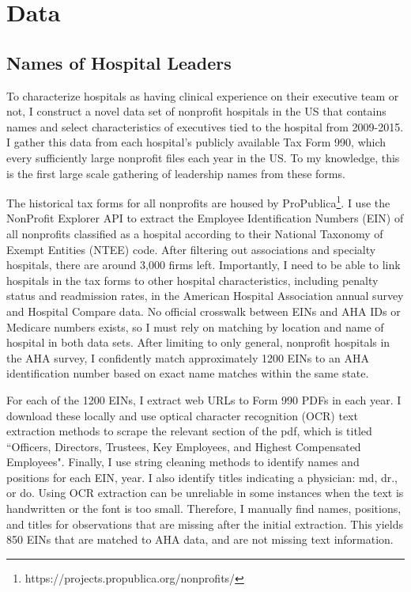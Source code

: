 \documentclass[12pt]{article}
\begin{document}
  
	
	\section{Data}\label{sec:data}

    \subsection{Names of Hospital Leaders}

    To characterize hospitals as having clinical experience on their executive team or not, I construct a novel data set of nonprofit hospitals in the US that contains names and select characteristics of executives tied to the hospital from 2009-2015. I gather this data from each hospital's publicly available Tax Form 990, which every sufficiently large nonprofit files each year in the US. To my knowledge, this is the first large scale gathering of leadership names from these forms. 

    The historical tax forms for all nonprofits are housed by ProPublica\footnote{https://projects.propublica.org/nonprofits/}. I use the NonProfit Explorer API to extract the Employee Identification Numbers (EIN) of all nonprofits classified as a hospital according to their National Taxonomy of Exempt Entities (NTEE) code. After filtering out associations and specialty hospitals, there are around 3,000 firms left. Importantly, I need to be able to link hospitals in the tax forms to other hospital characteristics, including penalty status and readmission rates, in the American Hospital Association annual survey and Hospital Compare data. No official crosswalk between EINs and AHA IDs or Medicare numbers exists, so I must rely on matching by location and name of hospital in both data sets. After limiting to only general, nonprofit hospitals in the AHA survey, I confidently match approximately 1200 EINs to an AHA identification number based on exact name matches within the same state. 
    
    For each of the 1200 EINs, I extract web URLs to Form 990 PDFs in each year. I download these locally and use optical character recognition (OCR) text extraction methods to scrape the relevant section of the pdf, which is titled ``Officers, Directors, Trustees, Key Employees, and Highest Compensated Employees". Finally, I use string cleaning methods to identify names and positions for each EIN, year. I also identify titles indicating a physician: md, dr., or do. Using OCR extraction can be unreliable in some instances when the text is handwritten or the font is too small. Therefore, I manually find names, positions, and titles for observations that are missing after the initial extraction. This yields 850 EINs that are matched to AHA data, and are not missing text information. 
\end{document}
